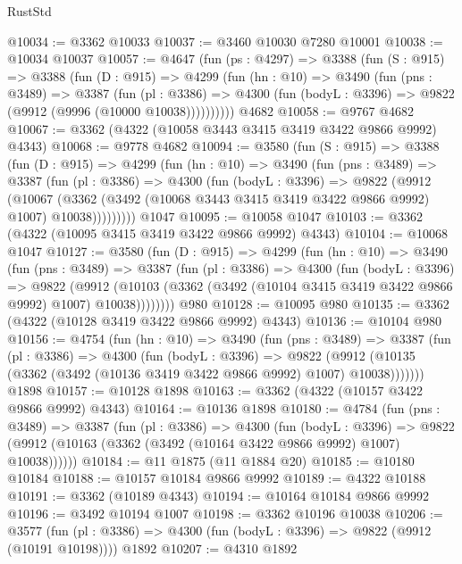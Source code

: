 \begin{lexlean}{RustStd}
\begin{coremodule}
@10034 := @3362 @10033
@10037 := @3460 @10030 @7280 @10001
@10038 := @10034 @10037
@10057 := @4647
    (fun (ps : @4297) =>
    @3388
      (fun (S : @915) =>
      @3388
        (fun (D : @915) =>
        @4299
          (fun (hn : @10) =>
          @3490
            (fun (pns : @3489) =>
            @3387
              (fun (pl : @3386) =>
              @4300 (fun (bodyL : @3396) => @9822 (@9912 (@9996 (@10000 @10038))))))))))
    @4682
@10058 := @9767 @4682
@10067 := @3362 (@4322 (@10058 @3443 @3415 @3419 @3422 @9866 @9992) @4343)
@10068 := @9778 @4682
@10094 := @3580
    (fun (S : @915) =>
    @3388
      (fun (D : @915) =>
      @4299
        (fun (hn : @10) =>
        @3490
          (fun (pns : @3489) =>
          @3387
            (fun (pl : @3386) =>
            @4300
              (fun (bodyL : @3396) =>
              @9822
                (@9912
                  (@10067
                    (@3362
                      (@3492 (@10068 @3443 @3415 @3419 @3422 @9866 @9992) @1007)
                      @10038)))))))))
    @1047
@10095 := @10058 @1047
@10103 := @3362 (@4322 (@10095 @3415 @3419 @3422 @9866 @9992) @4343)
@10104 := @10068 @1047
@10127 := @3580
    (fun (D : @915) =>
    @4299
      (fun (hn : @10) =>
      @3490
        (fun (pns : @3489) =>
        @3387
          (fun (pl : @3386) =>
          @4300
            (fun (bodyL : @3396) =>
            @9822
              (@9912
                (@10103 (@3362 (@3492 (@10104 @3415 @3419 @3422 @9866 @9992) @1007) @10038))))))))
    @980
@10128 := @10095 @980
@10135 := @3362 (@4322 (@10128 @3419 @3422 @9866 @9992) @4343)
@10136 := @10104 @980
@10156 := @4754
    (fun (hn : @10) =>
    @3490
      (fun (pns : @3489) =>
      @3387
        (fun (pl : @3386) =>
        @4300
          (fun (bodyL : @3396) =>
          @9822 (@9912 (@10135 (@3362 (@3492 (@10136 @3419 @3422 @9866 @9992) @1007) @10038)))))))
    @1898
@10157 := @10128 @1898
@10163 := @3362 (@4322 (@10157 @3422 @9866 @9992) @4343)
@10164 := @10136 @1898
@10180 := @4784
    (fun (pns : @3489) =>
    @3387
      (fun (pl : @3386) =>
      @4300
        (fun (bodyL : @3396) =>
        @9822 (@9912 (@10163 (@3362 (@3492 (@10164 @3422 @9866 @9992) @1007) @10038))))))
@10184 := @11 @1875 (@11 @1884 @20)
@10185 := @10180 @10184
@10188 := @10157 @10184 @9866 @9992
@10189 := @4322 @10188
@10191 := @3362 (@10189 @4343)
@10194 := @10164 @10184 @9866 @9992
@10196 := @3492 @10194 @1007
@10198 := @3362 @10196 @10038
@10206 := @3577
    (fun (pl : @3386) => @4300 (fun (bodyL : @3396) => @9822 (@9912 (@10191 @10198))))
    @1892
@10207 := @4310 @1892

\end{coremodule}
\end{lexlean}
